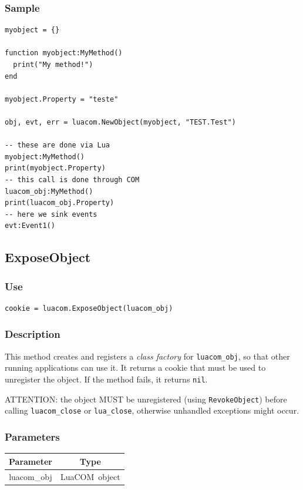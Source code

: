 \documentclass[11pt,a4paper,english]{report}
\newcommand{\ident}[1]{\mbox{\texttt{#1}}}
\newcommand{\techname}[1]{\mbox{#1}}
\newcommand{\luacom}{\techname{LuaCOM}}
\begin{document}
\subsubsection*{Sample}

\begin{verbatim}
myobject = {}

function myobject:MyMethod()
  print("My method!")
end

myobject.Property = "teste"

obj, evt, err = luacom.NewObject(myobject, "TEST.Test")

-- these are done via Lua
myobject:MyMethod()
print(myobject.Property)
-- this call is done through COM
luacom_obj:MyMethod()
print(luacom_obj.Property)
-- here we sink events
evt:Event1()
\end{verbatim}

\subsection*{ExposeObject}

\subsubsection*{Use}

\begin{verbatim}
cookie = luacom.ExposeObject(luacom_obj)
\end{verbatim}

\subsubsection*{Description}
This method creates and registers a \emph{class factory} for
\ident{luacom\_obj}, so that other running applications can use it. It
returns a cookie that must be used to unregister the object. If the
method fails, it returns \ident{nil}.

ATTENTION: the object MUST be unregistered (using
\verb+RevokeObject+) before calling \ident{luacom\_close} or
\ident{lua\_close}, otherwise unhandled exceptions might occur.

\subsubsection*{Parameters}

\begin{tabular}{|c|c|}
\hline
\bf Parameter & \bf Type  \\ \hline \hline
luacom\_obj & \luacom\ object  \\ \hline
\end{tabular}
\end{document}
